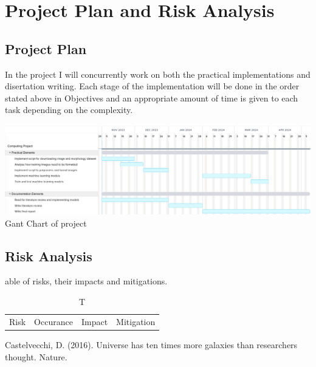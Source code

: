 \documentclass[runningheads]{llncs}
\begin{document}
\section{Project Plan and Risk Analysis}

\subsection{Project Plan}

In the project I will concurrently work on both the practical implementations
and disertation writing. Each stage of the implementation will be done in the
order stated above in Objectives and an appropriate amount of time is given to
each task depending on the complexity.

\includegraphics[width=\textwidth]{GantChart.png}
Gant Chart of project

\subsection{Risk Analysis}

\begin{table}
    \caption Table of risks, their impacts and mitigations.
    \begin{tabular}{|l|l|l|l|}
        \hline
        Risk & Occurance & Impact & Mitigation
        \hline


    \end{tabular}
\end{table}

\begin{thebibliography}{8}

Castelvecchi, D. (2016). Universe has ten times more galaxies than researchers
thought. Nature. 


\end{thebibliography}
\end{document}
